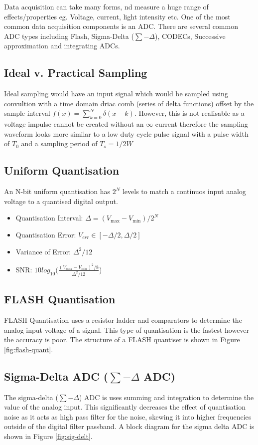 Data acquisition can take many forms, nd measure a huge range of effects/properties eg. Voltage,
current, light intensity etc. One of the most common data acquisition components is an ADC. There
are several common ADC types including Flash, Sigma-Delta ($\sum-\Delta$), CODECs, Successive
approximation and integrating ADCs.

\subsection{Ideal v. Practical Sampling}
Ideal sampling would have an input signal which would be sampled using convultion with a time domain
driac comb (series of delta functions) offset by the sample interval $f(x)=\sum_{k=0}^N \delta(x-k)$.
However, this is not realisable as a voltage impulse cannot be created without an $\infty$ current
therefore the sampling waveform looks more similar to a low duty cycle pulse signal with a pulse
width of $T_0$ and a sampling period of $T_s=1/2W$

\subsection{Uniform Quantisation}
An N-bit uniform quantisation has $2^N$ levels to match a continuos input analog voltage to a
quantised digital output.

\begin{itemize}
    \item Quantisation Interval: $\Delta = (V_{\textrm{max}} - V_{\textrm{min}})/2^N$
    \item Quantisation Error: $V_{err} \in [-\Delta / 2, \Delta / 2]$
    \item Variance of Error: $\Delta ^2/12$ 
    \item SNR: $10log_{10} (\frac{(V_{\textrm{max}}-V_{\textrm{min}})^2/8}{\Delta ^2/12}$)
\end{itemize}

\subsection{FLASH Quantisation}
FLASH Quantisation uses a resistor ladder and comparators to determine the analog input voltage of a
signal. This type of quantisation is the fastest however the accuracy is poor. The structure of a
FLASH quantiser is shown in Figure \ref{fig:flash-quant}.



\subsection{Sigma-Delta ADC ($\sum - \Delta$ ADC)}
The sigma-delta ($\sum - \Delta$) ADC is uses summing and integration to determine the value of the
analog input. This significantly decreases the effect of quantisation noise as it acts as high pass
filter for the noise, skewing it into higher frequencies outside of the digital filter passband. A
block diagram for the sigma delta ADC is shown in Figure \ref{fig:sig-delt}.

